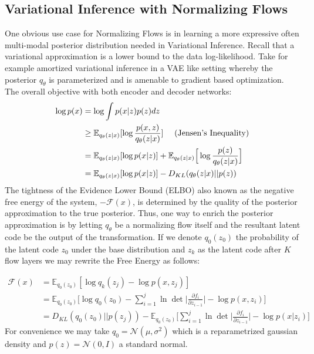 \subsection{Variational Inference with Normalizing Flows}
One obvious use case for Normalizing Flows is in learning a more expressive often multi-modal posterior distribution needed in Variational Inference. Recall that a variational approximation is a lower bound to the data log-likelihood. Take for example amortized variational inference in a VAE like setting whereby the posterior $q_{\theta}$ is parameterized and is amenable to gradient based optimization. The overall objective with both encoder and decoder networks:
\begin{align}
    \log p(x) & = \log \int p(x|z)p(z) dz \\
              & \geq \mathbb{E}_{q_{\theta}(z|x)}[\log \frac{p(x,z)}{q_{\theta}(z|x)}] \ \ \ \  (\textnormal{Jensen's Inequality}) \\
              & = \mathbb{E}_{q_{\theta}(z|x)} [\log p(x|z)] + \mathbb{E}_{q_{\theta}(z|x)}\Big[\log \frac{p(z)}{q_{\theta}(z|x)}\Big] \\
              & = \mathbb{E}_{q_{\theta}(z|x)} [\log p(x|z)] - D_{KL}(q_{\theta}(z|x) || p(z)) \label{nn_vae_perspective}
\end{align}
The tightness of the Evidence Lower Bound (ELBO) also known as the negative free energy of the system, $-\mathcal{F}(x)$, is determined by the quality of the posterior approximation to the true posterior. Thus, one way to enrich the posterior approximation is by letting $q_{\theta}$ be a normalizing flow itself and the resultant latent code be the output of the transformation. If we denote $q_0(z_0)$ the probability of the latent code $z_0$ under the base distribution and $z_k$ as the latent code after $K$ flow layers we may rewrite the Free Energy as follows:

\begin{align}
    \mathcal{F}(x) &= \mathbb{E}_{q_{0}(z_0)}[\log q_k(z_j) - \log p(x,z_j)] \\
    &= \mathbb{E}_{q_{0}(z_0)}\Big[\log q_0(z_0) - \sum_{i=1}^j\ln \det \Big \lvert \frac{\partial f_i}{\partial z_{i-1}} \Big \rvert - \log p(x,z_i)\Big]\\
    &= D_{KL}(q_0(z_0)|| p(z_j)) - \mathbb{E}_{q_{0}(z_0)}\Big[\sum_{i=1}^j\ln \det \Big \lvert \frac{\partial f_i}{\partial z_{i-1}} \Big \rvert - \log p(x|z_i)\Big]
\end{align}
For convenience we may take $q_0 = \mathcal{N}(\mu, \sigma^2)$ which is a reparametrized gaussian density and $p(z) = \mathcal{N}(0, I)$ a standard normal. 

